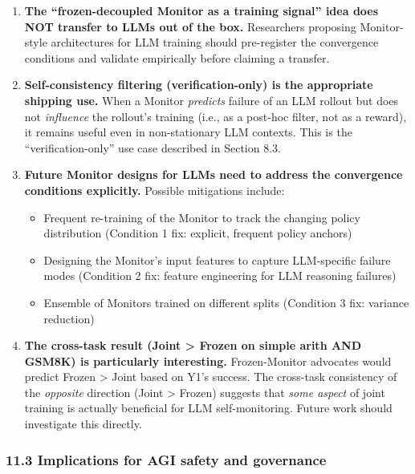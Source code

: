 \documentclass[11pt]{article}
\begin{document}
\begin{enumerate}
\def\labelenumi{\arabic{enumi}.}
\item
  \textbf{The ``frozen-decoupled Monitor as a training signal'' idea
  does NOT transfer to LLMs out of the box.} Researchers proposing
  Monitor-style architectures for LLM training should pre-register the
  convergence conditions and validate empirically before claiming a
  transfer.
\item
  \textbf{Self-consistency filtering (verification-only) is the
  appropriate shipping use.} When a Monitor \emph{predicts} failure of
  an LLM rollout but does not \emph{influence} the rollout's training
  (i.e., as a post-hoc filter, not as a reward), it remains useful even
  in non-stationary LLM contexts. This is the ``verification-only'' use
  case described in Section 8.3.
\item
  \textbf{Future Monitor designs for LLMs need to address the
  convergence conditions explicitly.} Possible mitigations include:

  \begin{itemize}
  
  \item
    Frequent re-training of the Monitor to track the changing policy
    distribution (Condition 1 fix: explicit, frequent policy anchors)
  \item
    Designing the Monitor's input features to capture LLM-specific
    failure modes (Condition 2 fix: feature engineering for LLM
    reasoning failures)
  \item
    Ensemble of Monitors trained on different splits (Condition 3 fix:
    variance reduction)
  \end{itemize}
\item
  \textbf{The cross-task result (Joint \textgreater{} Frozen on simple
  arith AND GSM8K) is particularly interesting.} Frozen-Monitor
  advocates would predict Frozen \textgreater{} Joint based on Y1's
  success. The cross-task consistency of the \emph{opposite} direction
  (Joint \textgreater{} Frozen) suggests that \emph{some aspect} of
  joint training is actually beneficial for LLM self-monitoring. Future
  work should investigate this directly.
\end{enumerate}

\subsubsection{11.3 Implications for AGI safety and
governance}\label{implications-for-agi-safety-and-governance}
\end{document}
